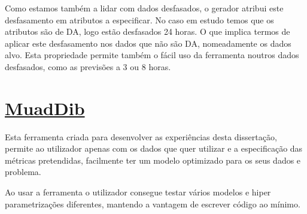 Como estamos também a lidar com dados desfasados, o gerador atribui este desfasamento em atributos a especificar. No caso em estudo temos que os atributos são de \gls{DA}, logo estão desfasados 24 horas. O que implica termos de aplicar este desfasamento nos dados que não são \gls{DA}, nomeadamente os dados alvo. Esta propriedade permite também o fácil uso da ferramenta noutros dados desfasados, como as previsões a 3 ou 8 horas.\par

\section{\href{https://github.com/alquimodelia/MuadDib}{MuadDib}\label{se:muaddib}}

Esta ferramenta criada para desenvolver as experiências desta dissertação, permite ao utilizador apenas com os dados que quer utilizar e a especificação das métricas pretendidas, facilmente ter um modelo optimizado para os seus dados e problema.\par
Ao usar a ferramenta o utilizador consegue testar vários modelos e hiper parametrizações diferentes, mantendo a vantagem de escrever código ao mínimo.\par
